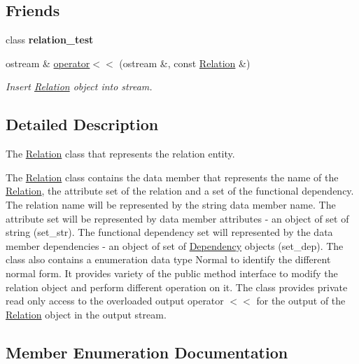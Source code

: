 \subsection*{Friends}
\begin{DoxyCompactItemize}
\item 
class {\bfseries relation\+\_\+test}\hypertarget{class_relation_a080e2dc68964d24a791885961f55a322}{}\label{class_relation_a080e2dc68964d24a791885961f55a322}

\item 
ostream \& \hyperlink{class_relation_ae37f6c1025dfc13dc413a73b5b630963}{operator$<$$<$} (ostream \&, const \hyperlink{class_relation}{Relation} \&)\hypertarget{class_relation_ae37f6c1025dfc13dc413a73b5b630963}{}\label{class_relation_ae37f6c1025dfc13dc413a73b5b630963}

\begin{DoxyCompactList}\small\item\em Insert \hyperlink{class_relation}{Relation} object into stream. \end{DoxyCompactList}\end{DoxyCompactItemize}


\subsection{Detailed Description}
The \hyperlink{class_relation}{Relation} class that represents the relation entity. 

The \hyperlink{class_relation}{Relation} class contains the data member that represents the name of the \hyperlink{class_relation}{Relation}, the attribute set of the relation and a set of the functional dependency. The relation name will be represented by the string data member name. The attribute set will be represented by data member attributes -\/ an object of set of string (set\+\_\+str). The functional dependency set will represented by the data member dependencies -\/ an object of set of \hyperlink{class_dependency}{Dependency} objects (set\+\_\+dep). The class also contains a enumeration data type Normal to identify the different normal form. It provides variety of the public method interface to modify the relation object and perform different operation on it. The class provides private read only access to the overloaded output operator $<$$<$ for the output of the \hyperlink{class_relation}{Relation} object in the output stream. 

\subsection{Member Enumeration Documentation}
